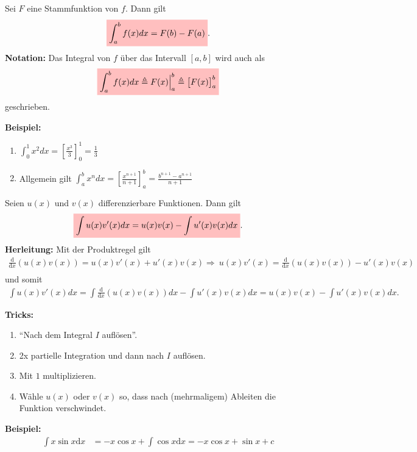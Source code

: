 \documentclass[12pt]{article}
\newcommand{\dx}{\mathrm{d}x}
\newcommand{\ddx}{\frac{\mathrm{d}}{\mathrm{d}x}}
\newcommand{\Follows}{\Longrightarrow\ }
\newenvironment{definition}[2][Definition]{\begin{trivlist}
        \item[\hskip \labelsep {\bfseries #1}\hskip \labelsep {\bfseries #2.}]}{\flushright{$\square$}\end{trivlist}}
\begin{document}
\begin{definition}{[Integrale Berechnen]}
    Sei $F$ eine Stammfunktion von $f$. Dann gilt
    \begin{align}
        \colorbox{pink}{\mathstrut$\displaystyle\int_{a}^{b}f(x)dx=F(b)-F(a)$}.
    \end{align}
    \textbf{Notation:}
    Das Integral von $f$ über das Intervall $[a,b]$ wird auch als
    \begin{align}
        \colorbox{pink}{\mathstrut$\displaystyle\int_{a}^{b}f(x)dx\triangleq F(x)\Big\vert_a^b\triangleq \left[F(x)\right]_a^b$}
    \end{align}
    geschrieben.

    \textbf{Beispiel:}
    \begin{enumerate}
        \item $\displaystyle\int_{0}^{1}x^2dx=\left[\frac{x^3}{3}\right]_0^1=\frac{1}{3}$
        \item Allgemein gilt
              $\displaystyle\int_{a}^{b}x^ndx=\left[\frac{x^{n+1}}{n+1}\right]_a^b=\frac{b^{n+1}-a^{n+1}}{n+1}$
    \end{enumerate}
\end{definition}

\begin{definition}{[Partielle Integration]}
    Seien $u(x)$ und $v(x)$ differenzierbare Funktionen. Dann gilt
    \begin{align}
        \colorbox{pink}{\mathstrut$\displaystyle\int u(x)v'(x)dx=u(x)v(x)-\displaystyle\int u'(x)v(x)dx$}.
    \end{align}
    \textbf{Herleitung:} Mit der Produktregel gilt
    \begin{align*}
        \ddx(u(x)v(x))  =u(x)v'(x)+u'(x)v(x) \Follows u(x)v'(x)=\ddx(u(x)v(x))-u'(x)v(x) \\
    \end{align*}
    und somit
    \begin{align*}
        \displaystyle\int u(x)v'(x)dx=\displaystyle\int \ddx(u(x)v(x))dx-\displaystyle\int u'(x)v(x)dx=u(x)v(x)-\displaystyle\int u'(x)v(x)dx.
    \end{align*}

    \textbf{Tricks:}
    \begin{enumerate}
        \item ``Nach dem Integral $I$ auflösen''.
        \item 2x partielle Integration und dann nach $I$ auflösen.
        \item Mit $1$ multiplizieren.
        \item Wähle $u(x)$ oder $v(x)$ so, dass nach (mehrmaligem) Ableiten die Funktion
              verschwindet.
    \end{enumerate}

    \textbf{Beispiel:}
    \begin{align*}
        \displaystyle\int x\sin x\dx & =-x\cos x+\displaystyle\int \cos x\dx=-x\cos x+\sin x+c
    \end{align*}
\end{definition}
\end{document}
